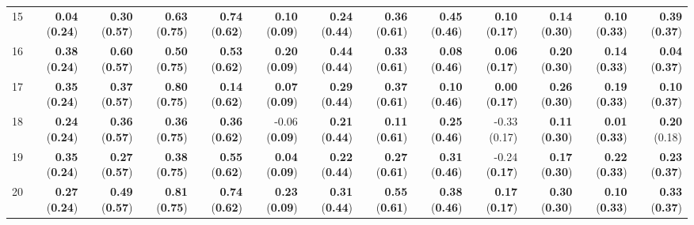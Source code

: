 \begin{sidewaystable}[ht]
\begin{center}
\begin{tabular}{rrrrr|rrrr|rrrr}
  15 & {\bf 0.04} ({\bf 0.24}) & {\bf 0.30} ({\bf 0.57}) & {\bf 0.63} ({\bf 0.75}) & {\bf 0.74} ({\bf 0.62}) & {\bf 0.10} ({\bf 0.09}) & {\bf 0.24} ({\bf 0.44}) & {\bf 0.36} ({\bf 0.61}) & {\bf 0.45} ({\bf 0.46}) & {\bf 0.10} ({\bf 0.17}) & {\bf 0.14} ({\bf 0.30}) & {\bf 0.10} ({\bf 0.33}) & {\bf 0.39} ({\bf 0.37}) \\ 
  16 & {\bf 0.38} ({\bf 0.24}) & {\bf 0.60} ({\bf 0.57}) & {\bf 0.50} ({\bf 0.75}) & {\bf 0.53} ({\bf 0.62}) & {\bf 0.20} ({\bf 0.09}) & {\bf 0.44} ({\bf 0.44}) & {\bf 0.33} ({\bf 0.61}) & {\bf 0.08} ({\bf 0.46}) & {\bf 0.06} ({\bf 0.17}) & {\bf 0.20} ({\bf 0.30}) & {\bf 0.14} ({\bf 0.33}) & {\bf 0.04} ({\bf 0.37}) \\ 
  17 & {\bf 0.35} ({\bf 0.24}) & {\bf 0.37} ({\bf 0.57}) & {\bf 0.80} ({\bf 0.75}) & {\bf 0.14} ({\bf 0.62}) & {\bf 0.07} ({\bf 0.09}) & {\bf 0.29} ({\bf 0.44}) & {\bf 0.37} ({\bf 0.61}) & {\bf 0.10} ({\bf 0.46}) & {\bf 0.00} ({\bf 0.17}) & {\bf 0.26} ({\bf 0.30}) & {\bf 0.19} ({\bf 0.33}) & {\bf 0.10} ({\bf 0.37}) \\ 
  18 & {\bf 0.24} ({\bf 0.24}) & {\bf 0.36} ({\bf 0.57}) & {\bf 0.36} ({\bf 0.75}) & {\bf 0.36} ({\bf 0.62}) & -0.06 ({\bf 0.09}) & {\bf 0.21} ({\bf 0.44}) & {\bf 0.11} ({\bf 0.61}) & {\bf 0.25} ({\bf 0.46}) & -0.33 (0.17) & {\bf 0.11} ({\bf 0.30}) & {\bf 0.01} ({\bf 0.33}) & {\bf 0.20} (0.18) \\ 
  19 & {\bf 0.35} ({\bf 0.24}) & {\bf 0.27} ({\bf 0.57}) & {\bf 0.38} ({\bf 0.75}) & {\bf 0.55} ({\bf 0.62}) & {\bf 0.04} ({\bf 0.09}) & {\bf 0.22} ({\bf 0.44}) & {\bf 0.27} ({\bf 0.61}) & {\bf 0.31} ({\bf 0.46}) & -0.24 ({\bf 0.17}) & {\bf 0.17} ({\bf 0.30}) & {\bf 0.22} ({\bf 0.33}) & {\bf 0.23} ({\bf 0.37}) \\ 
  20 & {\bf 0.27} ({\bf 0.24}) & {\bf 0.49} ({\bf 0.57}) & {\bf 0.81} ({\bf 0.75}) & {\bf 0.74} ({\bf 0.62}) & {\bf 0.23} ({\bf 0.09}) & {\bf 0.31} ({\bf 0.44}) & {\bf 0.55} ({\bf 0.61}) & {\bf 0.38} ({\bf 0.46}) & {\bf 0.17} ({\bf 0.17}) & {\bf 0.30} ({\bf 0.30}) & {\bf 0.10} ({\bf 0.33}) & {\bf 0.33} ({\bf 0.37}) \\ 
   \bottomrule
\end{tabular}
\end{center}
\end{sidewaystable}
